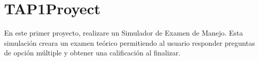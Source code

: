 \chapter{TAP1\+Proyect }
\hypertarget{md__r_e_a_d_m_e}{}\label{md__r_e_a_d_m_e}
\label{md__r_e_a_d_m_e_autotoc_md0}%
%


En este primer proyecto, realizare un Simulador de Examen de Manejo. Esta simulación creara un examen teórico permitiendo al usuario responder preguntas de opción múltiple y obtener una calificación al finalizar. 